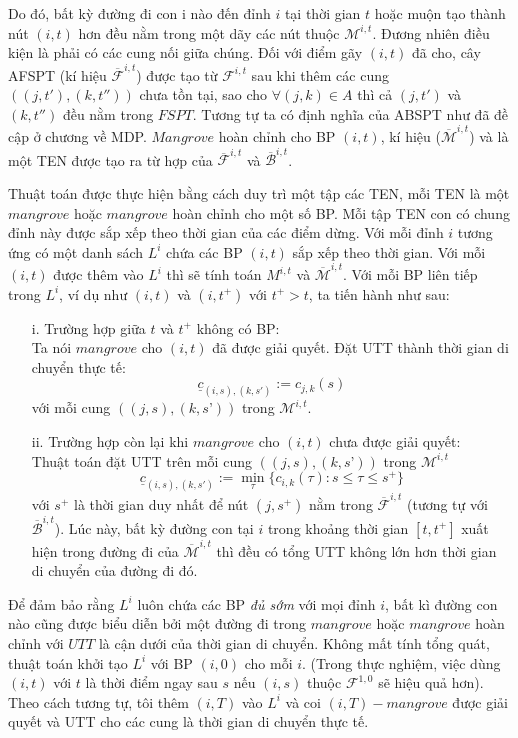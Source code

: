 \documentclass[../main.tex]{subfiles}
\begin{document}
Do đó, bất kỳ đường đi con i nào đến đỉnh \(i\) tại thời gian \(t\) hoặc
muộn tạo thành nút \((i,t)\) hơn đều nằm trong một dãy các nút thuộc
\(\mathcal M^{i, t}\). Đương nhiên điều kiện là phải có các cung nối giữa
chúng. Đối với điểm gãy \((i, t)\) đã cho, cây AFSPT (kí hiệu
\(\mathcal{\overline{F}}^{i,t}\)) được tạo từ \(\mathcal F^{i,t}\) sau khi thêm
các cung \(((j, t'), (k, t''))\) chưa tồn tại, sao cho
\(\forall (j, k) \in A\) thì cả \((j,t')\) và \((k,t'')\) đều nằm trong
\(FSPT.\) Tương tự ta có định nghĩa của ABSPT như đã đề cập ở chương về
MDP. \(Mangrove\) hoàn chỉnh cho BP \((i, t)\), kí hiệu
(\(\overline{\mathcal M}^{i,t}\)) và là một TEN được tạo ra từ hợp của
\(\mathcal{\overline{F}}^{i,t}\) và \(\mathcal{\overline{B}}^{i,t}\).

Thuật toán được thực hiện bằng cách duy trì một tập các TEN, mỗi TEN là
một \(mangrove\) hoặc \(mangrove\) hoàn chỉnh cho một số BP. Mỗi
tập TEN con có chung đỉnh này được sắp xếp theo thời gian của các điểm
dừng. Với mỗi đỉnh \(i\) tương ứng có một danh sách \(L^i\) chứa các
BP \((i, t)\) sắp xếp theo thời gian. Với mỗi \((i, t)\) được
thêm vào \(L^i\) thì sẽ tính toán \(M^{i, t}\) và
\(\overline{\mathcal M}^{i,t}\). Với mỗi BP liên tiếp trong \(L^i\),
ví dụ như \((i,t)\) và \((i,t^+)\) với \(t^+ > t\), ta tiến hành như
sau:

\begin{itemize}
\tightlist
\item[i.]
  Trường hợp giữa \(t\) và \(t^+\) không có BP: \\
  Ta nói
  \(mangrove\) cho \((i, t)\) đã được giải quyết. Đặt UTT thành thời
  gian di chuyển thực tế:
  \[\underline c_{(i, s), (k, s')}:=c_{j, k}(s)\] với mỗi cung
  \(((j,s),(k,s’))\) trong \(\mathcal M^{i,t}\).
\item[ii.]
  Trường hợp còn lại khi \(mangrove\) cho \((i, t)\) chưa được giải
  quyết: \\
  Thuật toán đặt UTT trên mỗi cung \(((j, s), (k, s’))\) trong
  \(\mathcal M^{i,t}\)
  \[\underline c_{(i, s), (k, s')}:=\min_\tau\{c_{i, k}(\tau):s\le \tau \le s^+\}\]
  với \(s^+\) là thời gian duy nhất để nút \((j, s^+)\) nằm trong
  \(\mathcal{\overline{F}}^{i,t}\) (tương tự với \(\mathcal{\overline{B}}^{i,t}\)).
  Lúc này, bất kỳ đường con tại \(i\) trong khoảng thời gian \([t,t^+]\)
  xuất hiện trong đường đi của \(\overline{\mathcal M}^{i,t}\) thì đều có
  tổng UTT không lớn hơn thời gian di chuyển của đường đi đó.
\end{itemize}

Để đảm bảo rằng \(L^i\) luôn chứa các BP \emph{đủ sớm} với mọi
đỉnh \(i\), bất kì đường con nào cũng được biểu diễn bởi một đường đi
trong \(mangrove\) hoặc \(mangrove\) hoàn chỉnh với \(UTT\) là cận dưới
của thời gian di chuyển. Không mất tính tổng quát, thuật toán khởi tạo
\(L^i\) với BP \((i, 0)\) cho mỗi \(i\). (Trong thực nghiệm, việc
dùng \((i, t)\) với \(t\) là thời điểm ngay sau \(s\) nếu \((i, s)\)
thuộc \(\mathcal F^{1,0}\) sẽ hiệu quả hơn). Theo cách tương tự, tôi thêm
\((i, T)\) vào \(L^i\) và coi \((i, T)-mangrove\) được giải quyết và UTT
cho các cung là thời gian di chuyển thực tế.
\end{document}
